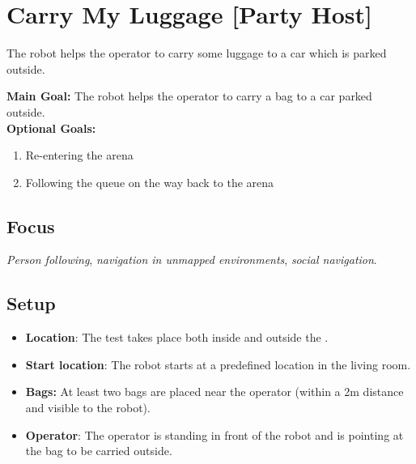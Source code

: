 \section{Carry My Luggage [Party Host]}
\label{test:carry-my-luggage}
The robot helps the operator to carry some luggage to a car which is parked outside.

\noindent \textbf{Main Goal:} The robot helps the operator to carry a bag to a car parked outside.\\

\noindent \textbf{Optional Goals:}
\begin{enumerate}[nosep]
	\item Re-entering the arena
	\item Following the queue on the way back to the arena
\end{enumerate}

\subsection*{Focus}
\emph{Person following}, \emph{navigation in unmapped environments}, \emph{social navigation}.

\subsection*{Setup}
\begin{itemize}[nosep]
	\item \textbf{Location}: The test takes place both inside and outside the \Arena{}.
	\item \textbf{Start location}: The robot starts at a predefined location in the living room.
	\item \textbf{Bags:} At least two bags are placed near the operator (within a 2m distance and visible to the robot).
	\item \textbf{Operator}: The operator is standing in front of the robot and is pointing at the bag to be carried outside.
\end{itemize}

